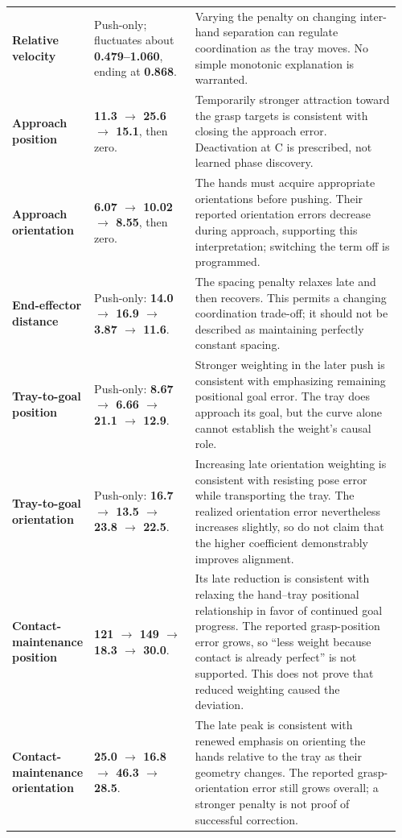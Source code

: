 \documentclass[11pt,a4paper]{article}
\begin{document}
\begin{longtable}{@{}p{0.17\linewidth}p{0.26\linewidth}p{0.53\linewidth}@{}}
\textbf{Relative velocity} & Push-only; fluctuates about \textbf{0.479--1.060}, ending at \textbf{0.868}. & Varying the penalty on changing inter-hand separation can regulate coordination as the tray moves. No simple monotonic explanation is warranted. \\
\textbf{Approach position} & \textbf{11.3 \(\rightarrow\) 25.6 \(\rightarrow\) 15.1}, then zero. & Temporarily stronger attraction toward the grasp targets is consistent with closing the approach error. Deactivation at C is prescribed, not learned phase discovery. \\
\textbf{Approach orientation} & \textbf{6.07 \(\rightarrow\) 10.02 \(\rightarrow\) 8.55}, then zero. & The hands must acquire appropriate orientations before pushing. Their reported orientation errors decrease during approach, supporting this interpretation; switching the term off is programmed. \\
\textbf{End-effector distance} & Push-only: \textbf{14.0 \(\rightarrow\) 16.9 \(\rightarrow\) 3.87 \(\rightarrow\) 11.6}. & The spacing penalty relaxes late and then recovers. This permits a changing coordination trade-off; it should not be described as maintaining perfectly constant spacing. \\
\textbf{Tray-to-goal position} & Push-only: \textbf{8.67 \(\rightarrow\) 6.66 \(\rightarrow\) 21.1 \(\rightarrow\) 12.9}. & Stronger weighting in the later push is consistent with emphasizing remaining positional goal error. The tray does approach its goal, but the curve alone cannot establish the weight's causal role. \\
\textbf{Tray-to-goal orientation} & Push-only: \textbf{16.7 \(\rightarrow\) 13.5 \(\rightarrow\) 23.8 \(\rightarrow\) 22.5}. & Increasing late orientation weighting is consistent with resisting pose error while transporting the tray. The realized orientation error nevertheless increases slightly, so do not claim that the higher coefficient demonstrably improves alignment. \\
\textbf{Contact-maintenance position} & \textbf{121 \(\rightarrow\) 149 \(\rightarrow\) 18.3 \(\rightarrow\) 30.0}. & Its late reduction is consistent with relaxing the hand--tray positional relationship in favor of continued goal progress. The reported grasp-position error grows, so ``less weight because contact is already perfect'' is not supported. This does not prove that reduced weighting caused the deviation. \\
\textbf{Contact-maintenance orientation} & \textbf{25.0 \(\rightarrow\) 16.8 \(\rightarrow\) 46.3 \(\rightarrow\) 28.5}. & The late peak is consistent with renewed emphasis on orienting the hands relative to the tray as their geometry changes. The reported grasp-orientation error still grows overall; a stronger penalty is not proof of successful correction. \\
\end{longtable}
\endgroup
\end{document}
